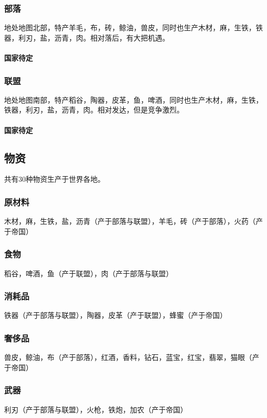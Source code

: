\documentclass[UTF8]{ctexart}
\begin{document}
\subsubsection{部落}
地处地图北部，特产羊毛，布，砖，鲸油，兽皮，同时也生产木材，麻，生铁，铁器，利刃，盐，沥青，肉。相对落后，有大把机遇。

\paragraph{国家待定}

\subsubsection{联盟}
地处地图南部，特产稻谷，陶器，皮革，鱼，啤酒，同时也生产木材，麻，生铁，铁器，利刃，盐，沥青，肉。相对发达，但是竞争激烈。

\paragraph{国家待定}

\subsection{物资}
共有30种物资生产于世界各地。

\subsubsection{原材料}
木材，麻，生铁，盐，沥青（产于部落与联盟），羊毛，砖（产于部落），火药（产于帝国）
\subsubsection{食物}
稻谷，啤酒，鱼（产于联盟），肉（产于部落与联盟）
\subsubsection{消耗品}
铁器（产于部落与联盟），陶器，皮革（产于联盟），蜂蜜（产于帝国）
\subsubsection{奢侈品}
兽皮，鲸油，布（产于部落），红酒，香料，钻石，蓝宝，红宝，翡翠，猫眼（产于帝国）
\subsubsection{武器}
利刃（产于部落与联盟），火枪，铁炮，加农（产于帝国）
\end{document}
